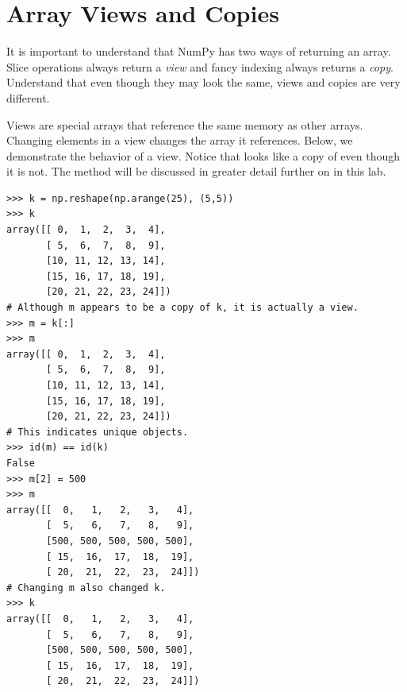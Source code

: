 \section*{Array Views and Copies} It is important to understand that
NumPy has two ways of returning an array. Slice operations always return
a \emph{view} and fancy indexing always returns a \emph{copy}.
Understand that even though they may look the same, views and copies are
very different.

Views are special arrays that reference the same memory as other arrays.
Changing elements in a view changes the array it references. Below, we
demonstrate the behavior of a view. Notice that  looks like a copy
of  even though it is not. 
The  method will be discussed in greater detail 
further on in this lab.
\begin{lstlisting}
>>> k = np.reshape(np.arange(25), (5,5)) 
>>> k
array([[ 0,  1,  2,  3,  4],
       [ 5,  6,  7,  8,  9],
       [10, 11, 12, 13, 14],
       [15, 16, 17, 18, 19],
       [20, 21, 22, 23, 24]])
# Although m appears to be a copy of k, it is actually a view. 
>>> m = k[:]
>>> m
array([[ 0,  1,  2,  3,  4],
       [ 5,  6,  7,  8,  9],
       [10, 11, 12, 13, 14],
       [15, 16, 17, 18, 19],
       [20, 21, 22, 23, 24]]) 
# This indicates unique objects.
>>> id(m) == id(k) 
False
>>> m[2] = 500 
>>> m
array([[  0,   1,   2,   3,   4],
       [  5,   6,   7,   8,   9],
       [500, 500, 500, 500, 500],
       [ 15,  16,  17,  18,  19],
       [ 20,  21,  22,  23,  24]])
# Changing m also changed k.
>>> k 
array([[  0,   1,   2,   3,   4],
       [  5,   6,   7,   8,   9],
       [500, 500, 500, 500, 500],
       [ 15,  16,  17,  18,  19],
       [ 20,  21,  22,  23,  24]])
\end{lstlisting} 

